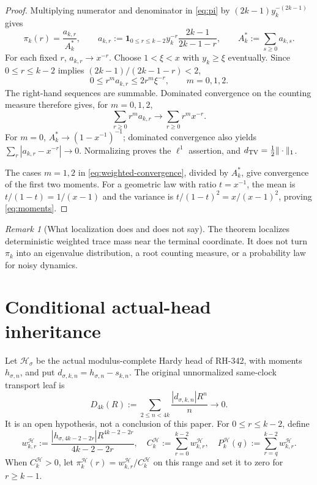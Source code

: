 \documentclass[11pt]{article}
\theoremstyle{remark}
\newtheorem{remark}[theorem]{Remark}
\newcommand{\cH}{\mathcal H}
\newcommand{\one}{\mathbf 1}
\begin{document}
\begin{proof}
Multiplying numerator and denominator in \eqref{eq:pi} by
$(2k-1)y_k^{-(2k-1)}$ gives
\begin{equation}\label{eq:a}
 \pi_k(r)=\frac{a_{k,r}}{A_k^*},\qquad
 a_{k,r}:=\one_{0\le r\le k-2}
 y_k^{-r}\frac{2k-1}{2k-1-r},
 \qquad A_k^*:=\sum_{s\ge0}a_{k,s}.
\end{equation}
For each fixed $r$, $a_{k,r}\to x^{-r}$.  Choose $1<\xi<x$ with
$y_k\ge\xi$ eventually.  Since $0\le r\le k-2$ implies
$(2k-1)/(2k-1-r)<2$,
\begin{equation}\label{eq:domination}
 0\le r^m a_{k,r}\le2r^m\xi^{-r},
 \qquad m=0,1,2.
\end{equation}
The right-hand sequences are summable.  Dominated convergence on the counting
measure therefore gives, for $m=0,1,2$,
\begin{equation}\label{eq:weighted-convergence}
 \sum_{r\ge0}r^m a_{k,r}\longrightarrow
 \sum_{r\ge0}r^m x^{-r}.
\end{equation}
For $m=0$, $A_k^*\to(1-x^{-1})^{-1}$; dominated convergence also yields
$\sum_r|a_{k,r}-x^{-r}|\to0$.  Normalizing proves the $\ell^1$ assertion,
and $d_{\rm TV}=\frac12\|\cdot\|_1$.

The cases $m=1,2$ in \eqref{eq:weighted-convergence}, divided by $A_k^*$,
give convergence of the first two moments.  For a geometric law with ratio
$t=x^{-1}$, the mean is $t/(1-t)=1/(x-1)$ and the variance is
$t/(1-t)^2=x/(x-1)^2$, proving \eqref{eq:moments}.
\end{proof}

\begin{remark}[What localization does and does not say]
The theorem localizes deterministic weighted trace mass near the terminal
coordinate.  It does not turn $\pi_k$ into an eigenvalue distribution, a root
counting measure, or a probability law for noisy dynamics.
\end{remark}

\section{Conditional actual-head inheritance}

Let $\cH_\sigma$ be the actual modulus-complete Hardy head of RH-342, with
moments $h_{\sigma,n}$, and put $d_{\sigma,k,n}=h_{\sigma,n}-s_{k,n}$.
The original unnormalized same-clock transport leaf is
\begin{equation}\label{eq:D}
 D_{4k}(R):=\sum_{2\le n<4k}
 \frac{|d_{\sigma,k,n}|R^n}{n}\longrightarrow0.
\end{equation}
It is an open hypothesis, not a conclusion of this paper.  For
$0\le r\le k-2$, define
\begin{equation}\label{eq:actual-weight}
 w_{k,r}^{\cH}:=
 \frac{|h_{\sigma,4k-2-2r}|R^{4k-2-2r}}{4k-2-2r},
 \quad
 C_k^{\cH}:=\sum_{r=0}^{k-2}w_{k,r}^{\cH},
 \quad
 P_k^{\cH}(q):=\sum_{r=q}^{k-2}w_{k,r}^{\cH}.
\end{equation}
When $C_k^{\cH}>0$, let
$\pi_k^{\cH}(r)=w_{k,r}^{\cH}/C_k^{\cH}$ on this range and set it to zero
for $r\ge k-1$.
\end{document}
